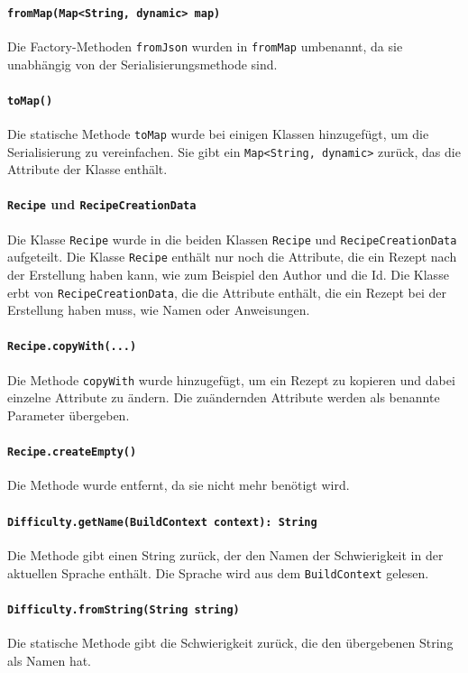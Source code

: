 \documentclass{implementierungsheft}
\begin{document}
\paragraph*{\texttt{fromMap(Map<String, dynamic> map)}} Die Factory-Methoden \texttt{fromJson} wurden in \texttt{fromMap} umbenannt, da sie unabhängig von der Serialisierungsmethode sind.
\paragraph*{\texttt{toMap()}} Die statische Methode \texttt{toMap} wurde bei einigen Klassen hinzugefügt, um die Serialisierung zu vereinfachen. Sie gibt ein \texttt{Map<String, dynamic>} zurück, das die Attribute der Klasse enthält.
\paragraph{\texttt{Recipe} und \texttt{RecipeCreationData}}
Die Klasse \texttt{Recipe} wurde in die beiden Klassen \texttt{Recipe} und \texttt{RecipeCreationData} aufgeteilt. Die Klasse \texttt{Recipe} enthält nur noch die Attribute, die ein Rezept nach der Erstellung haben kann, wie zum Beispiel den Author und die Id. Die Klasse erbt von \texttt{RecipeCreationData}, die die Attribute enthält, die ein Rezept bei der Erstellung haben muss, wie Namen oder Anweisungen.
\paragraph{\texttt{Recipe.copyWith(...)}} Die Methode \texttt{copyWith} wurde hinzugefügt, um ein Rezept zu kopieren und dabei einzelne Attribute zu ändern. Die zuändernden Attribute werden als benannte Parameter übergeben.
\paragraph{\texttt{Recipe.createEmpty()}} Die Methode wurde entfernt, da sie nicht mehr benötigt wird.
\paragraph{\texttt{Difficulty.getName(BuildContext context): String}}
Die Methode gibt einen String zurück, der den Namen der Schwierigkeit in der aktuellen Sprache enthält. Die Sprache wird aus dem \texttt{BuildContext} gelesen.
\paragraph{\texttt{Difficulty.fromString(String string)}}
Die statische Methode gibt die Schwierigkeit zurück, die den übergebenen String als Namen hat.
\end{document}
